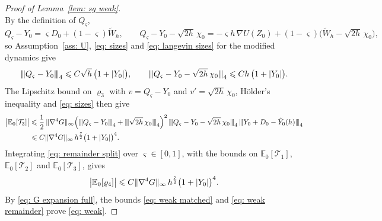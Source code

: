 \begin{proof}[Proof of Lemma~\ref{lem: sg weak}]
\begin{equation*}
    \end{equation*}
    By the definition of $Q_\varsigma$,
    \begin{equation*}
        Q_\varsigma - Y_0 = \varsigma D_0 + (1-\varsigma) \tilde W_h , \qquad
        Q_\varsigma - Y_0 - \sqrt{2h}\, \chi_0 = -\varsigma h\, \nabla U(Z_0) + (1-\varsigma) \bigl( \tilde W_h - \sqrt{2h}\, \chi_0 \bigr) ,
    \end{equation*}
    so Assumption~\ref{ass: U}, \eqref{eq: sizes} and \eqref{eq: langevin sizes} for the modified dynamics give
    \begin{equation*}
        {\vert\kern-0.25ex\vert\kern-0.25ex\vert} Q_\varsigma - Y_0 {\vert\kern-0.25ex\vert\kern-0.25ex\vert}_4 \leqslant C \sqrt h\, \bigl( 1+|Y_0| \bigr) , \qquad
        {\vert\kern-0.25ex\vert\kern-0.25ex\vert} Q_\varsigma - Y_0 - \sqrt{2h}\, \chi_0 {\vert\kern-0.25ex\vert\kern-0.25ex\vert}_4 \leqslant C h\, \bigl( 1+|Y_0| \bigr) .
    \end{equation*}
    The Lipschitz bound on $\varrho_3$ with $v = Q_\varsigma - Y_0$ and $v' = \sqrt{2h}\, \chi_0$, H\"older's inequality and \eqref{eq: sizes} then give
    \begin{equation*}
    \begin{aligned}
        \bigl| \mathbb E_0[\mathcal T_3] \bigr| & \leqslant \frac12\, \lVert \nabla^4 G \rVert_\infty \Bigl( {\vert\kern-0.25ex\vert\kern-0.25ex\vert} Q_\varsigma - Y_0 {\vert\kern-0.25ex\vert\kern-0.25ex\vert}_4 + {\vert\kern-0.25ex\vert\kern-0.25ex\vert} \sqrt{2h}\, \chi_0 {\vert\kern-0.25ex\vert\kern-0.25ex\vert}_4 \Bigr)^2\, {\vert\kern-0.25ex\vert\kern-0.25ex\vert} Q_\varsigma - Y_0 - \sqrt{2h}\, \chi_0 {\vert\kern-0.25ex\vert\kern-0.25ex\vert}_4\, {\vert\kern-0.25ex\vert\kern-0.25ex\vert} Y_0 + D_0 - \tilde Y_0(h) {\vert\kern-0.25ex\vert\kern-0.25ex\vert}_4 \\
        & \leqslant C \lVert \nabla^4 G \rVert_\infty\, h^{\frac72} \bigl( 1+|Y_0| \bigr)^{4} .
    \end{aligned}
    \end{equation*}
    Integrating \eqref{eq: remainder split} over $\varsigma \in [0,1]$, with the bounds on $\mathbb E_0[\mathcal T_1]$, $\mathbb E_0[\mathcal T_2]$ and $\mathbb E_0[\mathcal T_3]$, gives
    \begin{equation}
        \bigl| \mathbb E_0[\varrho_4] \bigr| \leqslant C \lVert \nabla^4 G \rVert_\infty\, h^{\frac72} \bigl( 1+|Y_0| \bigr)^{4} .
        \label{eq: weak remainder}
    \end{equation}
    By \eqref{eq: G expansion full}, the bounds \eqref{eq: weak matched} and \eqref{eq: weak remainder} prove \eqref{eq: weak}.


\end{proof}
